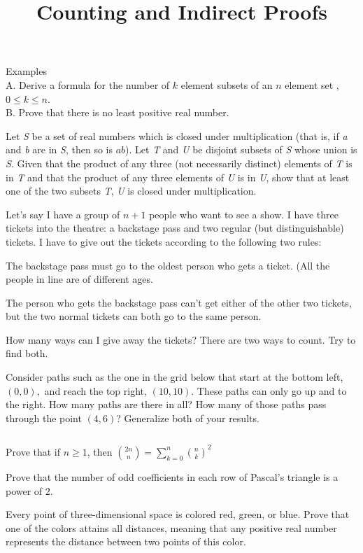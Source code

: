 \documentclass{article}
\begin{document}
\title{Counting and Indirect Proofs}
\author{}
\date{}
\maketitle

Examples\\
A. Derive a formula for the number of \(k\) element subsets of an \(n\) element set , \(0\leq k\leq n\).\\
B. Prove that there is no least positive real number.

Let \textit{ S} be a set of real numbers which is closed under multiplication (that is, if \textit{ a} and \textit{ b} are in \textit{ S}, then so
is \(a b\)). Let \textit{ T} and \textit{ U} be disjoint subsets of \textit{ S} whose union is \textit{ S}. Given that the product of any three (not
necessarily distinct) elements of \textit{ T} is in \textit{ T} and that the product of any three elements of \textit{ U} is in \textit{ U}, show
that at least one of the two subsets \textit{ T}, \textit{ U} is closed under multiplication.

Let's say I have a group of \(n+1\) people who want to see a show. I have three tickets into the theatre: a backstage pass and two regular (but distinguishable)
tickets. I have to give out the tickets according to the following two rules:

The backstage pass must go to the oldest person who gets a ticket. (All the people in line are of different ages.

The person who gets the backstage pass can't get either of the other two tickets, but the two normal tickets can both go to the same person.

How many ways can I give away the tickets? { }There are two ways to count. Try to find both.

 Consider paths such as the one in the grid below that start at the bottom left, \((0,0),\) and reach the top right, \((10,10)\). { } These paths
can only go up and to the right. { } How many paths are there in all? { }How many of those paths pass through the point \((4,6)\)? { } Generalize
both of your results.

 { }\(\)

Prove that if \(n\geq 1\), then { }\(\binom{2 n}{n}=\sum _{k=0}^n \binom{n}{k}^2\)

Prove that the number of odd coefficients in each row of Pascal{'}s triangle is a power of 2.

Every point of three-dimensional space is colored red, green, or blue. Prove that one of the colors attains all distances, meaning that any positive
real number represents the distance between two points of this color.
\end{document}
